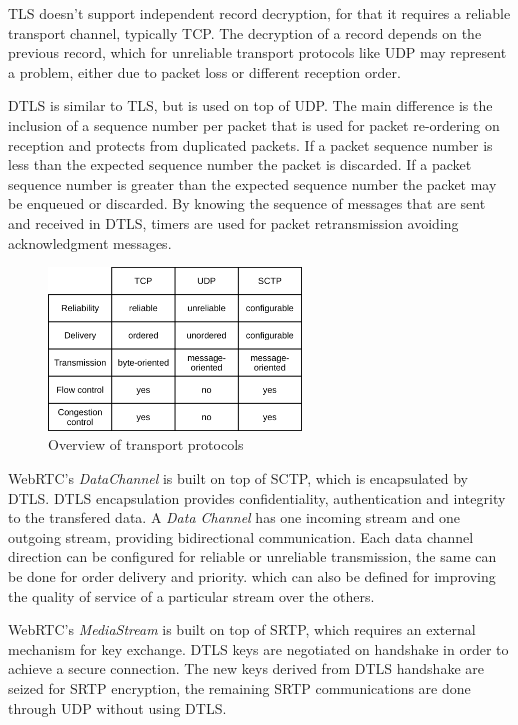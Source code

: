 \ac{TLS} doesn't support independent record decryption, for that it requires a reliable transport channel, typically \ac{TCP}. The decryption of a record depends on the previous record, which for unreliable transport protocols like \ac{UDP} may represent a problem, either due to packet loss or different reception order.

\ac{DTLS} is similar to \ac{TLS}, but is used on top of \ac{UDP}.
The main difference is the inclusion of a sequence number per packet that is used for packet re-ordering on reception and protects from duplicated packets. If a packet sequence number is less than the expected sequence number the packet is discarded. If a packet sequence number is greater than the expected sequence number the packet may be enqueued or discarded. By knowing the sequence of messages that are sent and received in \ac{DTLS}, timers are used for packet retransmission avoiding acknowledgment messages.

\begin{figure}[H]
	\centering
	\includegraphics[width=0.6\textwidth]{figures/basic_protocols.png}
	\caption{Overview of transport protocols}
\end{figure}

\ac{WebRTC}'s \emph{DataChannel} is built on top of \ac{SCTP}, which is encapsulated by \ac{DTLS}. \ac{DTLS} encapsulation provides confidentiality, authentication and integrity to the transfered data. A \emph{Data Channel} has one incoming stream and one outgoing stream, providing bidirectional communication. Each data channel direction can be configured for reliable or unreliable transmission, the same can be done for order delivery and priority. which can also be defined for improving the quality of service of a particular stream over the others.

\ac{WebRTC}'s \emph{MediaStream} is built on top of \ac{SRTP}, which requires an external mechanism for key exchange. \ac{DTLS} keys are negotiated on handshake in order to achieve a secure connection. The new keys derived from \ac{DTLS} handshake are seized for \ac{SRTP} encryption, the remaining \ac{SRTP} communications are done through \ac{UDP} without using \ac{DTLS}.

